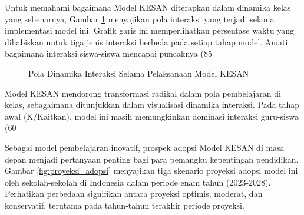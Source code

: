 \documentclass[12pt,a4paper,oneside]{book}
\begin{document}
Untuk memahami bagaimana Model KESAN diterapkan dalam dinamika kelas yang sebenarnya, Gambar \ref{fig:dinamika_interaksi} menyajikan pola interaksi yang terjadi selama implementasi model ini. Grafik garis ini memperlihatkan persentase waktu yang dihabiskan untuk tiga jenis interaksi berbeda pada setiap tahap model. Amati bagaimana interaksi siswa-siswa mencapai puncaknya (85%

\begin{figure}[H]
  \centering
  \caption{Pola Dinamika Interaksi Selama Pelaksanaan Model KESAN}
  \label{fig:dinamika_interaksi}
\end{figure}

Model KESAN mendorong transformasi radikal dalam pola pembelajaran di kelas, sebagaimana ditunjukkan dalam visualisasi dinamika interaksi. Pada tahap awal (K/Kaitkan), model ini masih memungkinkan dominasi interaksi guru-siswa (60%

Sebagai model pembelajaran inovatif, prospek adopsi Model KESAN di masa depan menjadi pertanyaan penting bagi para pemangku kepentingan pendidikan. Gambar \ref{fig:proyeksi_adopsi} menyajikan tiga skenario proyeksi adopsi model ini oleh sekolah-sekolah di Indonesia dalam periode enam tahun (2023-2028). Perhatikan perbedaan signifikan antara proyeksi optimis, moderat, dan konservatif, terutama pada tahun-tahun terakhir periode proyeksi.
\end{document}
